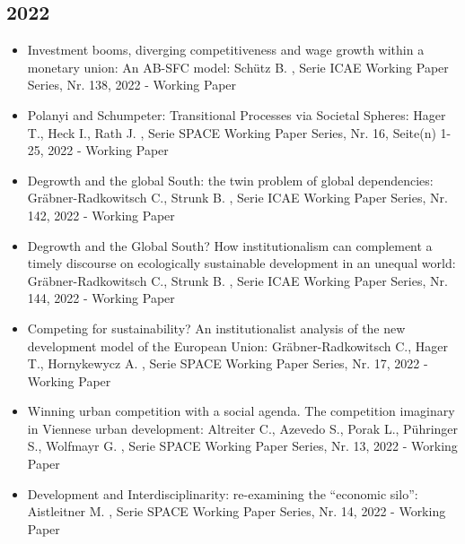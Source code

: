  \subsection{2022} 
 \begin{itemize} 
	 \item Investment booms, diverging competitiveness and wage growth within a monetary union: An AB-SFC model: Schütz B. , Serie ICAE Working Paper Series, Nr. 138, 2022 - Working Paper
	 \item Polanyi and Schumpeter: Transitional Processes via Societal Spheres: Hager T., Heck I., Rath J. , Serie SPACE Working Paper Series, Nr. 16, Seite(n) 1-25, 2022 - Working Paper
	 \item Degrowth and the global South: the twin problem of global dependencies: Gräbner-Radkowitsch C., Strunk B. , Serie ICAE Working Paper Series, Nr. 142, 2022 - Working Paper
	 \item Degrowth and the Global South? How institutionalism can complement a timely discourse on ecologically sustainable development in an unequal world: Gräbner-Radkowitsch C., Strunk B. , Serie ICAE Working Paper Series, Nr. 144, 2022 - Working Paper
	 \item Competing for sustainability? An institutionalist analysis of the new development model of the European Union: Gräbner-Radkowitsch C., Hager T., Hornykewycz A. , Serie SPACE Working Paper Series, Nr. 17, 2022 - Working Paper
	 \item Winning urban competition with a social agenda. The competition imaginary in Viennese urban development: Altreiter C., Azevedo S., Porak L., Pühringer S., Wolfmayr G. , Serie SPACE Working Paper Series, Nr. 13, 2022 - Working Paper
	 \item Development and Interdisciplinarity: re-examining the “economic silo”: Aistleitner M. , Serie SPACE Working Paper Series, Nr. 14, 2022 - Working Paper
\end{itemize} 
